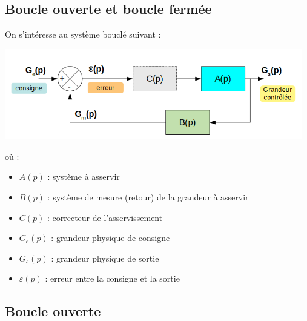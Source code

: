 \enteteThematiqueObligatoire{}
\enteteCorrection{}




\subsection*{Boucle ouverte et boucle fermée}

On s'intéresse au système bouclé suivant :

\begin{center}
	\includegraphics[width=13cm]{images/syst_asservi.png}
\end{center}

où :

\begin{itemize}
	\item $A(p)$ : système à asservir
	\item $B(p)$ : système de mesure (retour) de la grandeur à asservir
	\item $C(p)$ : correcteur de l'asservissement
	\item $G_e(p)$ : grandeur physique de consigne
	\item $G_s(p)$ : grandeur physique de sortie
	\item $\varepsilon(p)$ : erreur entre la consigne et la sortie
\end{itemize}


\subsection*{Boucle ouverte}

